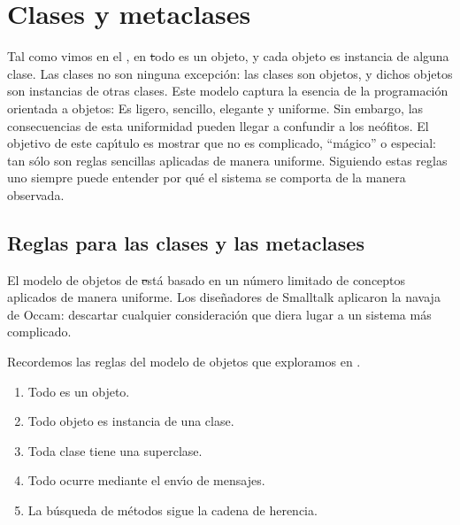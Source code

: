 \documentclass[a4paper,10pt,twoside]{book}
\begin{document}
	\renewcommand{\nnbb}[2]{} %
	\sloppy
\fi
\chapter{Clases y metaclases}

Tal como vimos en el , en \st todo es un objeto, y cada objeto es instancia de alguna clase. Las clases no son ninguna excepci\'on:
las clases son objetos, y dichos objetos son instancias de otras clases.
Este modelo captura la esencia de la programaci\'on orientada a objetos: Es ligero, sencillo, elegante y uniforme.
Sin embargo, las consecuencias de esta uniformidad pueden llegar a confundir a los ne\'ofitos. El objetivo de este cap\'{\i}tulo es mostrar que no es complicado, ``m\'agico'' o especial: tan s\'olo son reglas sencillas aplicadas de manera uniforme.
Siguiendo estas reglas uno siempre puede entender por qu\'e el sistema se comporta de la manera observada.


\section{Reglas para las clases y las metaclases}

El modelo de objetos de  \st est\'a basado en un n\'umero limitado de conceptos aplicados de manera uniforme. Los dise\~nadores de Smalltalk aplicaron la navaja de Occam: descartar cualquier consideraci\'on que diera lugar a un sistema m\'as complicado.

Recordemos las reglas del modelo de objetos que exploramos en .

\begin{enumerate}[label={\textbf{Regla \arabic{*}}.}, ref={Regla \arabic{*}}, leftmargin=*, widest=10]
\item{} %
	Todo es un objeto.

\item{} %
	Todo objeto es instancia de una clase.

\item{} %
	Toda clase tiene una superclase.

\item{} %
	Todo ocurre mediante el env\'{\i}o de mensajes.

\item{} %
	La b\'usqueda de m\'etodos sigue la cadena de herencia.

\end{enumerate}
\end{document}
